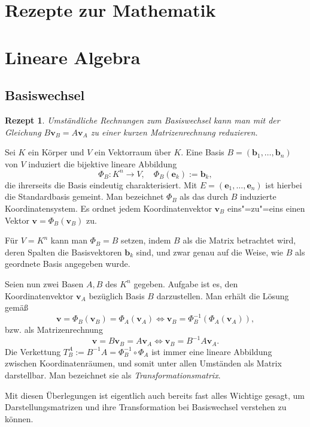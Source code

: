 \documentclass[a4paper,10pt,fleqn,twocolumn,twoside,dvipdfmx]{scrartcl}
\theoremstyle{rmbox}
\newtheorem{Rezept}{Rezept}[section]
\newcommand{\bv}[1]{\mathbf{#1}}
\begin{document}
\section*{\LARGE Rezepte zur Mathematik}

\tableofcontents

\section{Lineare Algebra}

\subsection{Basiswechsel}

\begin{Rezept}
Umständliche Rechnungen zum Basiswechsel kann man mit der
Gleichung $B\bv v_B = A\bv v_A$ zu einer kurzen Matrizenrechnung
reduzieren.
\end{Rezept}

\noindent
Sei $K$ ein Körper und $V$ ein Vektorraum über $K$.
Eine Basis $B=(\bv b_1,\ldots, \bv b_n)$ von $V$ induziert die
bijektive lineare Abbildung
\[\Phi_B\colon K^n\to V,\quad \Phi_B(\bv e_k) := \bv b_k,\]
die ihrerseits die Basis eindeutig charakterisiert. Mit
$E=(\bv e_1,\ldots,\bv e_n)$ ist hierbei die Standardbasis gemeint.
Man bezeichnet $\Phi_B$ als das durch $B$ induzierte Koordinatensystem.
Es ordnet jedem Koordinatenvektor $\bv v_B$ eins"=zu"=eins einen Vektor
$\bv v = \Phi_B(\bv v_B)$ zu.

Für $V=K^n$ kann man $\Phi_B=B$ setzen, indem $B$ als die Matrix
betrachtet wird, deren Spalten die Basisvektoren $\bv b_k$ sind,
und zwar genau auf die Weise, wie $B$ als geordnete Basis angegeben
wurde.

Seien nun zwei Basen $A,B$ des $K^n$ gegeben. Aufgabe ist es, den
Koordinatenvektor $\bv v_A$ bezüglich Basis $B$ darzustellen.
Man erhält die Lösung gemäß
\[\bv v = \Phi_B(\bv v_B) = \Phi_A(\bv v_A) \iff
\bv v_B = \Phi_B^{-1}(\Phi_A(\bv v_A)),\]
bzw. als Matrizenrechnung
\[\bv v = B\bv v_B = A\bv v_A\iff
\bv v_B = B^{-1}A\bv v_A.\]
Die Verkettung $T_B^A := B^{-1}A = \Phi_B^{-1}\circ\Phi_A$
ist immer eine lineare Abbildung zwischen
Koordinatenräumen, und somit unter allen Umständen als Matrix
darstellbar. Man bezeichnet sie als \emph{Transformationsmatrix}.

Mit diesen Überlegungen ist eigentlich auch bereits fast alles
Wichtige gesagt, um Darstellungsmatrizen und ihre Transformation
bei Basiswechsel verstehen zu können.
\end{document}
